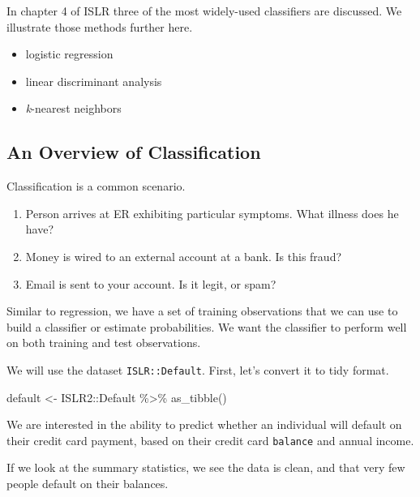\documentclass[
]{article}
\newenvironment{Shaded}{\begin{snugshade}}{\end{snugshade}}
\newcommand{\FunctionTok}[1]{\textcolor[rgb]{0.00,0.00,0.00}{#1}}
\newcommand{\NormalTok}[1]{#1}
\newcommand{\OtherTok}[1]{\textcolor[rgb]{0.56,0.35,0.01}{#1}}
\newcommand{\SpecialCharTok}[1]{\textcolor[rgb]{0.00,0.00,0.00}{#1}}
\providecommand{\tightlist}{%
  \setlength{\itemsep}{0pt}\setlength{\parskip}{0pt}}
\begin{document}
In chapter 4 of ISLR three of the most widely-used classifiers are
discussed. We illustrate those methods further here.

\begin{itemize}
\tightlist
\item
  logistic regression
\item
  linear discriminant analysis
\item
  \emph{k}-nearest neighbors
\end{itemize}

\hypertarget{an-overview-of-classification}{%
\subsection{An Overview of
Classification}\label{an-overview-of-classification}}

Classification is a common scenario.

\begin{enumerate}
\def\labelenumi{\arabic{enumi}.}
\tightlist
\item
  Person arrives at ER exhibiting particular symptoms. What illness does
  he have?
\item
  Money is wired to an external account at a bank. Is this fraud?
\item
  Email is sent to your account. Is it legit, or spam?
\end{enumerate}

Similar to regression, we have a set of training observations that we
can use to build a classifier or estimate probabilities. We want the
classifier to perform well on both training and test observations.

We will use the dataset \texttt{ISLR::Default}. First, let's convert it
to tidy format.

\begin{Shaded}
\begin{Highlighting}[]
\NormalTok{default }\OtherTok{\textless{}{-}}\NormalTok{ ISLR2}\SpecialCharTok{::}\NormalTok{Default }\SpecialCharTok{\%\textgreater{}\%} \FunctionTok{as\_tibble}\NormalTok{()}
\end{Highlighting}
\end{Shaded}

We are interested in the ability to predict whether an individual will
default on their credit card payment, based on their credit card
\texttt{balance} and annual income.

If we look at the summary statistics, we see the data is clean, and that
very few people default on their balances.
\end{document}
